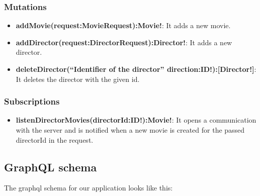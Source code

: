 \documentclass[]{book}
\providecommand{\tightlist}{%
  \setlength{\itemsep}{0pt}\setlength{\parskip}{0pt}}
\begin{document}
\subsubsection{Mutations}\label{mutations}

\begin{itemize}
\tightlist
\item
  \textbf{addMovie(request:MovieRequest):Movie!}: It adds a new movie.
\item
  \textbf{addDirector(request:DirectorRequest):Director!}: It adds a new
  director.
\item
  \textbf{deleteDirector(``Identifier of the director''
  direction:ID!):{[}Director!{]}}: It deletes the director with the
  given id.
\end{itemize}

\subsubsection{Subscriptions}\label{subscriptions}

\begin{itemize}
\tightlist
\item
  \textbf{listenDirectorMovies(directorId:ID!):Movie!}: It opens a
  communication with the server and is notified when a new movie is
  created for the passed directorId in the request.
\end{itemize}

\subsection{GraphQL schema}\label{graphql-schema}

The graphql schema for our application looks like this:
\end{document}
